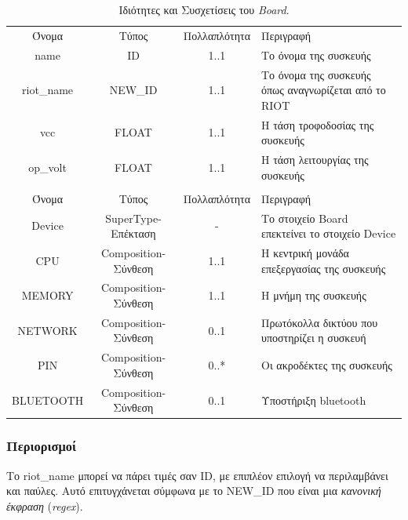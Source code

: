 \begin{table}[H]
	\begin{center}
		\begin{tabular}{ | c | c | c| m{5.5cm} | }
			\hline
			\rowcolor{Gray}
			\multicolumn{4}{|c|}{\textbf{Ιδιότητες}}\\
			\hline
			\rowcolor{Gray}
			Όνομα & Τύπος & Πολλαπλότητα & Περιγραφή \\
			\hline
			name & ID & 1..1 &  Το όνομα της συσκευής \\
			\hline
			riot\_name & NEW\_ID & 1..1 &  Το όνομα της συσκευής όπως αναγνωρίζεται από το RIOT \\
			\hline
			vcc & FLOAT & 1..1 & Η τάση τροφοδοσίας της συσκευής \\
			\hline
			op\_volt & FLOAT & 1..1 &  Η τάση λειτουργίας της συσκευής \\
			\hline
			\rowcolor{Gray}
			\multicolumn{4}{|c|}{\textbf{Συσχετίσεις}}\\
			\hline
			\rowcolor{Gray}
			Όνομα & Τύπος & Πολλαπλότητα & Περιγραφή \\
			\hline
			Device & SuperType-Επέκταση & - &  Το στοιχείο Board επεκτείνει το στοιχείο Device \\
			\hline
			CPU & Composition-Σύνθεση & 1..1 &  Η κεντρική μονάδα επεξεργασίας της συσκευής \\
			\hline
			MEMORY & Composition-Σύνθεση & 1..1 &  Η μνήμη της συσκευής \\
			\hline
			NETWORK & Composition-Σύνθεση & 0..1 &  Πρωτόκολλα δικτύου που υποστηρίζει η συσκευή \\
			\hline
			PIN & Composition-Σύνθεση & 0..* &  Οι ακροδέκτες της συσκευής \\
			\hline
			BLUETOOTH & Composition-Σύνθεση & 0..1 &  Υποστήριξη bluetooth \\
			\hline
		\end{tabular}
		\caption{Ιδιότητες και Συσχετίσεις του \textit{Board}.}
		\label{tab:board}
	\end{center}
\end{table}

\subsubsection*{Περιορισμοί}

\noindent Το riot\_name μπορεί να πάρει τιμές σαν ID, με επιπλέον επιλογή να περιλαμβάνει και παύλες. Αυτό επιτυγχάνεται σύμφωνα με το NEW\_ID που είναι μια \textit{κανονική έκφραση} (\textit{regex}).

